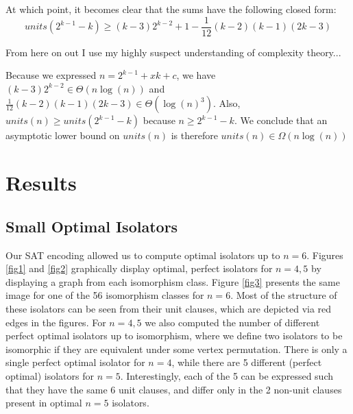 \documentclass[a4paper,UKenglish,cleveref, autoref, thm-restate]{lipics-v2021}
\begin{document}
At which point, it becomes clear that the sums have the following closed form:
\begin{equation}
units(2^{k-1} - k) \geq (k-3)2^{k-2} + 1 - \frac{1}{12}(k-2)(k-1)(2k - 3)
\end{equation}

From here on out I use my highly suspect understanding of complexity theory...

Because we expressed $n = 2^{k-1} + xk + c$, we have $(k-3)2^{k-2} \in \Theta(n\log(n))$ and  $\frac{1}{12}(k-2)(k-1)(2k - 3) \in \Theta(\log(n)^3)$. Also, $units(n) \geq units(2^{k-1} - k)$ because $n \geq 2^{k-1} - k$. We conclude that an asymptotic lower bound on $units(n)$ is therefore $units(n) \in \Omega(n\log(n))$

\section{Results}

\subsection{Small Optimal Isolators}

Our SAT encoding allowed us to compute optimal isolators up to $n=6$. Figures \ref{fig1} and \ref{fig2} graphically display optimal, perfect isolators for $n=4,5$ by displaying a graph from each isomorphism class. Figure \ref{fig3} presents the same image for one of the 56 isomorphism classes for $n=6$. Most of the structure of these isolators can be seen from their unit clauses, which are depicted via red edges in the figures. For $n=4,5$ we also computed the number of different perfect optimal isolators up to isomorphism, where we define two isolators to be isomorphic if they are equivalent under some vertex permutation. There is only a single perfect optimal isolator for $n=4$, while there are 5 different (perfect optimal) isolators for $n=5$. Interestingly, each of the 5 can be expressed such that they have the same 6 unit clauses, and differ only in the 2 non-unit clauses present in optimal $n=5$ isolators.
\end{document}
